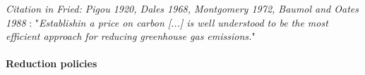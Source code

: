 \textit{Citation in Fried: Pigou 1920, Dales 1968, Montgomery 1972, Baumol and Oates 1988 }: "\textit{Establishin a price on carbon [...] is well understood to be the most efficient approach for reducing greenhouse gas emissions.}"

\paragraph{Reduction policies}